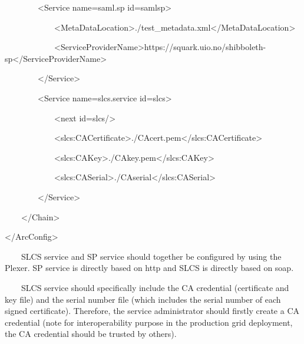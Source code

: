 \documentclass{article}
\begin{document}
{\ttfamily\color{black}
\ \ \ \ \ \ \ \ {\textless}Service
name={\textquotesingle}\textcolor[rgb]{0.77254903,0.0,0.043137256}{saml.sp}{\textquotesingle}
id={\textquotesingle}samlsp{\textquotesingle}{\textgreater} }

{\ttfamily\color{black}
\ \ \ \ \ \ \ \ \ \ \ \ {\textless}MetaDataLocation{\textgreater}./test\_metadata.xml{\textless}/MetaDataLocation{\textgreater}
}

{\ttfamily\color{black}
\ \ \ \ \ \ \ \ \ \ \ \ {\textless}ServiceProviderName{\textgreater}https://squark.uio.no/shibboleth-sp{\textless}/ServiceProviderName{\textgreater}
}

{\ttfamily\color{black}
\ \ \ \ \ \ \ \ {\textless}/Service{\textgreater} }

{\ttfamily\color{black}
\ \ \ \ \ \ \ \ {\textless}Service
name={\textquotedbl}\textcolor[rgb]{0.8627451,0.13725491,0.0}{slcs.service}{\textquotedbl}
id={\textquotedbl}slcs{\textquotedbl}{\textgreater} }

{\ttfamily\color{black}
\ \ \ \ \ \ \ \ \ \ \ \ {\textless}next
id={\textquotedbl}slcs{\textquotedbl}/{\textgreater} }

{\ttfamily\color{black}
\ \ \ \ \ \ \ \ \ \ \ \ {\textless}slcs:CACertificate{\textgreater}./CAcert.pem{\textless}/slcs:CACertificate{\textgreater}
}

{\ttfamily\color{black}
\ \ \ \ \ \ \ \ \ \ \ \ {\textless}slcs:CAKey{\textgreater}./CAkey.pem{\textless}/slcs:CAKey{\textgreater}
}

{\ttfamily\color{black}
\ \ \ \ \ \ \ \ \ \ \ \ {\textless}slcs:CASerial{\textgreater}./CAserial{\textless}/slcs:CASerial{\textgreater}
}

{\ttfamily\color{black}
\ \ \ \ \ \ \ \ {\textless}/Service{\textgreater} }

{\ttfamily\color{black}
\ \ \ \ {\textless}/Chain{\textgreater} }

{\ttfamily\color{black}
{\textless}/ArcConfig{\textgreater} }

{\color{black}
\ \ \ \ SLCS service and SP service should together be configured by
using the Plexer. SP service is directly based on http and SLCS is
directly based on soap. }

{\color{black}
\ \ \ \ SLCS service should specifically include the CA credential
(certificate and key file) and the serial number file (which includes
the serial number of each signed certificate). Therefore, the service
administrator should firstly create a CA credential (note for
interoperability purpose in the production grid deployment, the CA
credential should be trusted by others). }
\end{document}
